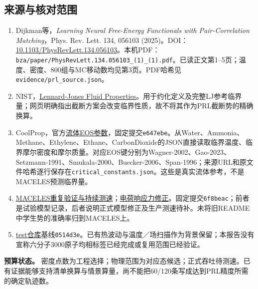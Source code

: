 \documentclass[a4paper]{ctexart}
\begin{document}
\subsection*{来源与核对范围}
\small
\begin{enumerate}
\item Dijkman等，\emph{Learning Neural Free-Energy Functionals with Pair-Correlation Matching}，Phys. Rev. Lett. 134, 056103 (2025)。DOI：\href{https://doi.org/10.1103/PhysRevLett.134.056103}{10.1103/PhysRevLett.134.056103}。本机PDF：\texttt{bza/paper/PhysRevLett.134.056103\_(1)\_(1).pdf}。已读正文第1--5页；温度、密度、800组与MC移动数均见第3页。PDF哈希见\texttt{evidence/prl\_source.json}。
\item NIST，\href{https://www.nist.gov/mml/csd/chemical-informatics-group/lennard-jones-fluid-properties}{Lennard-Jones Fluid Properties}。用于约化定义及完整LJ参考临界量；网页明确指出截断方案会改变临界性质，故不将其作为PRL截断势的精确换算。
\item CoolProp，官方\href{https://github.com/CoolProp/CoolProp/tree/e647ebe1734b4b4c01ceb341158d937019d06614/dev/fluids}{流体EOS参数}，固定提交\texttt{e647ebe}。从Water、Ammonia、Methane、Ethylene、Ethane、CarbonDioxide的JSON直接读取临界温度、临界摩尔密度和摩尔质量。对应EOS键分别为Wagner-2002、Gao-2023、Setzmann-1991、Smukala-2000、Buecker-2006、Span-1996；来源URL和原文件哈希逐行保存在\texttt{critical\_constants.json}。这些是真实流体参考，不是MACELES预测临界量。
\item \href{https://github.com/Yong-Q/symmetrix-polar/blob/6f8beacbe211dcd1688de40b3175c36501f92fea/docs/results/MACELES_Q4_VERIFY_2026-10-30.md}{MACELES重复验证与持续测速}；\href{https://github.com/Yong-Q/symmetrix-polar/blob/6f8beacbe211dcd1688de40b3175c36501f92fea/docs/results/MACELES_FORCE_FIX_2026-10-30.md}{电荷响应力修正}。固定提交\texttt{6f8beac}；前者是试验模型记录，后者说明正式模型修正及生产测速待补。未将旧README中学生势的准确率归到MACELES上。
\item \href{https://github.com/Yong-Q/test}{test仓库}基线\texttt{0514d3e}。已有热波动与温度／场扫描作为背景保留；本报告没有宣称六分子3000原子均相标签已经完成或复用范围已经验证。
\end{enumerate}
\normalsize
\textbf{预算状态。} 密度点数为工程选择；物理范围为对应态候选；正式吞吐待测速。已有证据能够支持清单换算与情景算量，尚不能把60/120条写成达到PRL精度所需的确定轨迹数。
\end{document}
